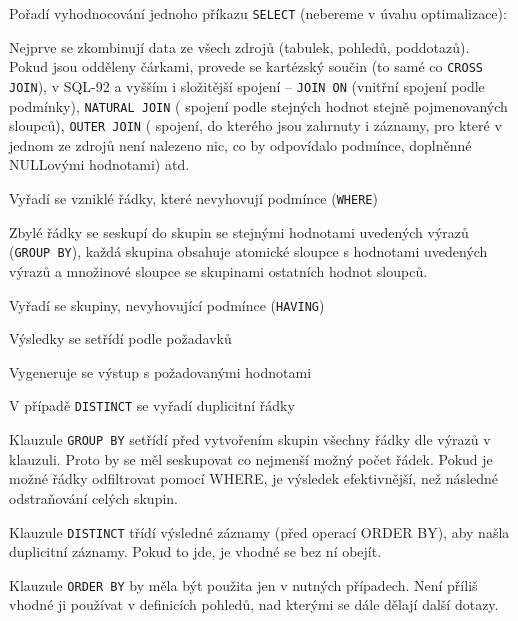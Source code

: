 \medskip\noindent
Pořadí vyhodnocování jednoho příkazu \texttt{SELECT} (nebereme v úvahu optimalizace):
\begin{penumerate}
    \item Nejprve se zkombinují data ze všech zdrojů (tabulek, pohledů, poddotazů). Pokud jsou odděleny čárkami, provede se kartézský součin (to samé co \texttt{CROSS JOIN}), v SQL-92 a vyšším i složitější spojení -- \texttt{JOIN ON} (vnitřní spojení podle podmínky), \texttt{NATURAL JOIN} ( spojení podle stejných hodnot stejně pojmenovaných sloupců), \texttt{OUTER JOIN} ( spojení, do kterého jsou zahrnuty i záznamy, pro které v jednom ze zdrojů není nalezeno nic, co by odpovídalo podmínce, doplněnné NULLovými hodnotami) atd.
    \item Vyřadí se vzniklé řádky, které nevyhovují podmínce (\texttt{WHERE})
    \item Zbylé řádky se seskupí do skupin se stejnými hodnotami uvedených výrazů (\texttt{GROUP BY}), každá skupina obsahuje atomické sloupce s hodnotami uvedených výrazů a množinové sloupce se skupinami ostatních hodnot sloupců.
    \item Vyřadí se skupiny, nevyhovující podmínce (\texttt{HAVING})
    \item Výsledky se setřídí podle požadavků
    \item Vygeneruje se výstup s požadovanými hodnotami
    \item V případě \texttt{DISTINCT} se vyřadí duplicitní řádky
\end{penumerate}


\begin{poznamka}
\begin{pitemize}
    \item Klauzule \texttt{GROUP BY} setřídí před vytvořením skupin všechny řádky dle výrazů v klauzuli. Proto by se měl seskupovat co nejmenší možný počet řádek. Pokud je možné řádky odfiltrovat pomocí WHERE, je výsledek efektivnější, než následné odstraňování celých skupin.
    \item  Klauzule \texttt{DISTINCT} třídí výsledné záznamy (před operací ORDER BY), aby našla duplicitní záznamy. Pokud to jde, je vhodné se bez ní obejít.
    \item Klauzule \texttt{ORDER BY} by měla být použita jen v nutných případech. Není příliš vhodné ji používat v definicích pohledů, nad kterými se dále dělají další dotazy.
\end{pitemize}
\end{poznamka}


